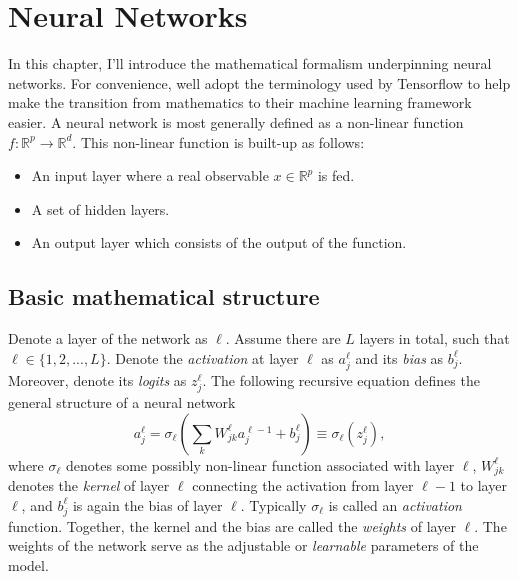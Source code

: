 \section{Neural Networks}\label{sec:neural_networks}
In this chapter, I'll introduce the mathematical formalism underpinning
neural networks. For convenience, well adopt the terminology used by Tensorflow\cite{tf} 
to help make the transition from mathematics to their machine learning framework easier.
A neural network is most generally defined as a non-linear function $f : \mathbb{R}^p \to \mathbb{R}^d$. This non-linear function is built-up as follows:
\begin{itemize}
    \item An input layer where a real observable $x \in \mathbb{R}^p$ is fed.
    \item A set of hidden layers.
    \item An output layer which consists of the output of the function.
\end{itemize}

\subsection{Basic mathematical structure}
Denote a layer of the network as $\ell$. Assume there are $L$ layers in total, such that $\ell \in \{1,2,...,L\}$. 
Denote the \textit{activation} at layer $\ell$ as $a_j^\ell$ and its \textit{bias} as $b_j^\ell$. 
Moreover, denote its \textit{logits} as $z_j^\ell$. The following recursive equation 
defines the general structure of a neural network
\begin{equation}
    a_j^\ell = \sigma_\ell \left(\sum_k W_{jk}^\ell a_j^{\ell - 1} + b_j^\ell\right) \equiv \sigma_\ell(z_j^\ell), 
\end{equation}
where $\sigma_\ell$ denotes some possibly non-linear function associated 
with layer $\ell$, $W_{jk}^\ell$ denotes the \textit{kernel} of layer $\ell$ connecting the activation from layer $\ell-1$ to layer $\ell$, 
and $b_j^\ell$ is again the bias of layer $\ell$. Typically $\sigma_\ell$ is called an \textit{activation} function. 
Together, the kernel and the bias are called the \textit{weights} of layer $\ell$. 
The weights of the network serve as the adjustable or \textit{learnable} parameters of the model.


